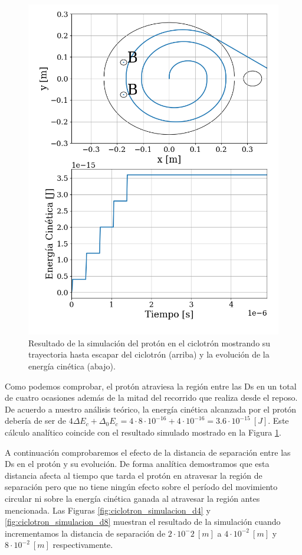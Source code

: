 \documentclass[journal]{IEEEtran}
\begin{document}
\begin{figure}[!htb]
    \centering
    \includegraphics[width=\linewidth]{ciclotron_simulacion.png}
    \caption{Resultado de la simulación del protón en el ciclotrón mostrando su trayectoria hasta escapar del ciclotrón (arriba) y la evolución de la energía cinética (abajo).}
    \label{fig:ciclotron_simulacion}
\end{figure}

\clearpage

Como podemos comprobar, el protón atraviesa la región entre las Ds en un total de cuatro ocasiones además de la mitad del recorrido que realiza desde el reposo. De acuerdo a nuestro análisis teórico, la energía cinética alcanzada por el protón debería de ser de $4\Delta E_c + \Delta_0 E_c = 4\cdot 8\cdot 10^{-16} + 4\cdot 10^{-16} = 3.6\cdot 10^{-15}~[J]$. Este cálculo analítico coincide con el resultado simulado mostrado en la Figura \ref{fig:ciclotron_simulacion}.

A continuación comprobaremos el efecto de la distancia de separación entre las Ds en el protón y su evolución. De forma analítica demostramos que esta distancia afecta al tiempo que tarda el protón en atravesar la región de separación pero que no tiene ningún efecto sobre el período del movimiento circular ni sobre la energía cinética ganada al atravesar la región antes mencionada. Las Figuras \ref{fig:ciclotron_simulacion_d4} y \ref{fig:ciclotron_simulacion_d8} muestran el resultado de la simulación cuando incrementamos la distancia de separación de $2\cdot 10^-2~[m]$ a $4\cdot 10^{-2}~[m]$ y $8\cdot 10^{-2}~[m]$ respectivamente.
\end{document}
